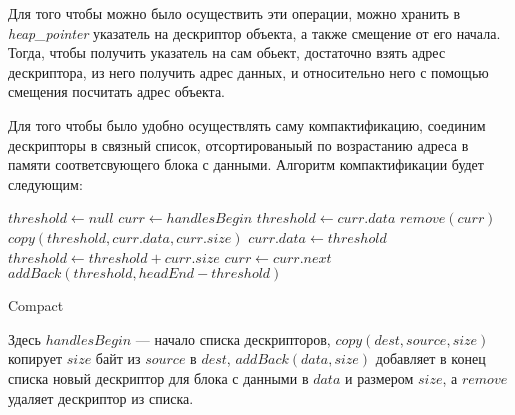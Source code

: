 Для того чтобы можно было осуществить эти операции, можно хранить в \textit{heap\_pointer}
указатель на дескриптор объекта, а также смещение от его начала. Тогда, чтобы получить
указатель на сам обьект, достаточно взять адрес дескриптора, из него 
получить адрес данных, и относительно него с помощью смещения посчитать адрес объекта. 

Для того чтобы было удобно осуществлять саму компактификацию, соединим дескрипторы в связный список, отсортированыый по возрастанию адреса в памяти
соответсвующего блока с данными. Алгоритм компактификации будет следующим:

\begin{algorithm}[H]
\begin{algorithmic}[1]
\State $threshold\gets null$
\State $curr\gets handlesBegin$
			\State $threshold\gets curr.data$		
		\EndIf
		\State $remove(curr)$		
			\State $copy(threshold, curr.data, curr.size)$
			\State $curr.data\gets threshold$
			\State $threshold\gets threshold + curr.size$
		\EndIf
	\State $curr\gets curr.next$
\EndWhile
\State $addBack(threshold, headEnd - threshold)$
\end{algorithmic}
\caption{Compact}
\end{algorithm}

Здесь $handlesBegin$ --- начало списка дескрипторов, $copy(dest, source, size)$ копирует
$size$ байт из $source$ в $dest$, $addBack(data, size)$ добавляет в конец списка
новый дескриптор для блока с данными в $data$ и размером $size$, а $remove$ удаляет
дескриптор из списка.


